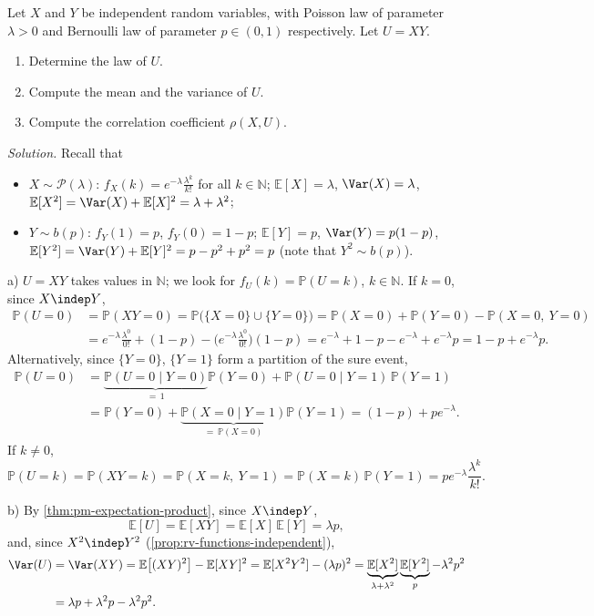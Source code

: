 \begin{example}\label{exa:rv-poisson-bernoulli}
Let $X$ and $Y$ be independent random variables, with Poisson law of parameter $\lambda>0$ and
Bernoulli law of parameter $p\in(0,1)$ respectively. Let $U=XY$.
\begin{enumerate}[label=\alph*)]
  \item Determine the law of $U$.
  \item Compute the mean and the variance of $U$.
  \item Compute the correlation coefficient $\rho(X,U)$.
\end{enumerate}

\emph{Solution.} Recall that
\begin{itemize}
  \item $X\sim\mathcal P(\lambda)$: $f_X(k)=e^{-\lambda}\frac{\lambda^k}{k!}$ for all $k\in\mathbb N$;
    $\mathbb E[X]=\lambda$, $\Var(X)=\lambda$, $\mathbb E[X^2]=\Var(X)+\mathbb E[X]^2=\lambda+\lambda^2$;
  \item $Y\sim b(p)$: $f_Y(1)=p$, $f_Y(0)=1-p$; $\mathbb E[Y]=p$, $\Var(Y)=p(1-p)$,
    $\mathbb E[Y^2]=\Var(Y)+\mathbb E[Y]^2=p-p^2+p^2=p$ (note that $Y^2\sim b(p)$).
\end{itemize}

a) $U=XY$ takes values in $\mathbb N$; we look for $f_U(k)=\mathbb P(U=k)$, $k\in\mathbb N$. If $k=0$,
since $X\indep Y$,
\[
\begin{aligned}
  \mathbb P(U=0)&=\mathbb P(XY=0)=\mathbb P\big(\{X=0\}\cup\{Y=0\}\big)=\mathbb P(X=0)+\mathbb P(Y=0)-\mathbb P(X=0,\ Y=0)\\
  &=e^{-\lambda}\frac{\lambda^0}{0!}+(1-p)-\Big(e^{-\lambda}\frac{\lambda^0}{0!}\Big)(1-p)
  =e^{-\lambda}+1-p-e^{-\lambda}+e^{-\lambda}p=1-p+e^{-\lambda}p .
\end{aligned}
\]
Alternatively, since $\{Y=0\}$, $\{Y=1\}$ form a partition of the sure event,
\[
\begin{aligned}
  \mathbb P(U=0)&=\underbrace{\mathbb P(U=0\mid Y=0)}_{=\,1}\mathbb P(Y=0)+\mathbb P(U=0\mid Y=1)\,\mathbb P(Y=1)\\
  &=\mathbb P(Y=0)+\underbrace{\mathbb P(X=0\mid Y=1)}_{=\,\mathbb P(X=0)}\mathbb P(Y=1)=(1-p)+pe^{-\lambda}.
\end{aligned}
\]
If $k\ne0$,
\[
  \mathbb P(U=k)=\mathbb P(XY=k)=\mathbb P(X=k,\ Y=1)=\mathbb P(X=k)\,\mathbb P(Y=1)=pe^{-\lambda}\frac{\lambda^k}{k!}.
\]

b) By \cref{thm:pm-expectation-product}, since $X\indep Y$,
\[
  \mathbb E[U]=\mathbb E[XY]=\mathbb E[X]\,\mathbb E[Y]=\lambda p,
\]
and, since $X^2\indep Y^2$ (\cref{prop:rv-functions-independent}),
\[
\begin{aligned}
  \Var(U)&=\Var(XY)=\mathbb E\big[(XY)^2\big]-\mathbb E[XY]^2=\mathbb E[X^2Y^2]-(\lambda p)^2
  =\underbrace{\mathbb E[X^2]}_{\lambda+\lambda^2}\underbrace{\mathbb E[Y^2]}_{p}-\lambda^2p^2\\
  &=\lambda p+\lambda^2p-\lambda^2p^2 .
\end{aligned}
\]


\end{example}
